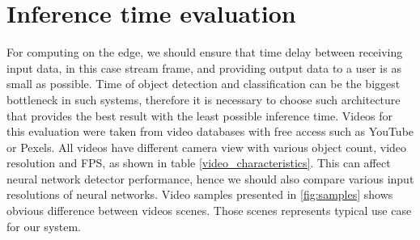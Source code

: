 \documentclass[twoside]{ctuthesis}
\theoremstyle{plain}
\theoremstyle{definition}
\theoremstyle{note}
\begin{document}
\section{Inference time evaluation}
For computing on the edge, we should ensure that time delay between receiving input data, in this case stream frame,  and providing output data to a user is as small as possible. Time of object detection and classification can be the biggest bottleneck in such systems, therefore it is necessary to choose such architecture that provides the best result with the least possible inference time. 
Videos for this evaluation were taken from video databases with free access such as YouTube or Pexels. All videos have different camera view with various object count, video resolution and FPS, as shown in table \ref{video_characteristics}. This can affect neural network detector performance, hence we should also compare various input resolutions of neural networks. Video samples presented in \ref{fig:samples} shows obvious difference between videos scenes. Those scenes represents typical use case for our system.
\end{document}
